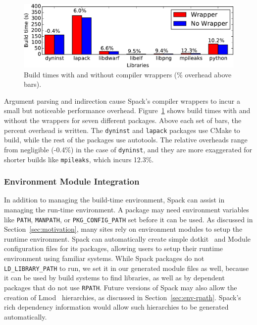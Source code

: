 \begin{figure}
	\centering
	\includegraphics[width=\columnwidth]{figs/wrappers/wrapper-overhead.pdf}
	\caption{
		Build times with and without compiler wrappers\newline
		(\% overhead above bars).
		\label{fig:wrapper-overhead}
	}
\end{figure}

Argument parsing and indirection cause Spack's compiler wrappers to incur a small
but noticeable performance overhead.  Figure~\ref{fig:wrapper-overhead} shows build times
with and without the wrappers for seven different packages. Above each set of bars,
the percent overhead is written. The {\tt dyninst} and {\tt lapack} packages
use CMake to build, while the rest of the packages use autotools.
The relative overheads range from negligible (-0.4\%) in the case of {\tt dyninst},
and they are more exaggerated for shorter builds like {\tt mpileaks}, which
incurs 12.3\%.

\subsubsection{Environment Module Integration}
\label{sec:envmodule}
In addition to managing the build-time environment, Spack can assist in managing
the run-time environment.  A package may need environment variables like {\tt PATH},
{\tt MANPATH}, or {\tt PKG\_CONFIG\_PATH} set before it can be used.
As discussed in Section~\ref{sec:motivation}, many sites rely on environment
modules to setup the runtime environment.  Spack can automatically create simple
dotkit~\cite{dotkit} and Module configuration files for its packages, allowing
users to setup their runtime environment using familiar systems.  While Spack
packages do not {\tt LD\_LIBRARY\_PATH} to run, we set it in our generated module
files as well, because it can be used by build systems to find libraries, as well
as by dependent packages that do not use {\tt RPATH}.
%
Future versions of Spack may also allow the creation of Lmod~\cite{mclay:lmod}
hierarchies, as discussed in Section~\ref{sec:env-rpath}. Spack's rich
dependency information would allow such hierarchies to be generated automatically.












